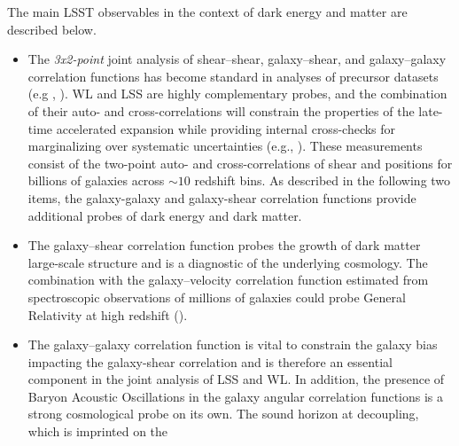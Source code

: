 The main LSST observables in the context of dark energy and matter are described below.

\begin{itemize}
\item The {\sl 3x2-point} joint analysis of shear--shear, galaxy--shear, and galaxy--galaxy
correlation functions has become standard in analyses of precursor datasets (e.g \cite{2017arXiv170801530D},
\cite{2017arXiv170706627J}). WL and LSS are highly complementary probes, and the combination
of their auto- and cross-correlations will constrain the properties of the late-time accelerated expansion while providing
internal cross-checks for marginalizing over systematic uncertainties (e.g., \cite{2017arXiv171003235M}).
These measurements consist of the two-point auto- and cross-correlations of shear and positions for billions of galaxies across $\sim 10$ redshift bins.
As described in the following two items, the galaxy-galaxy and galaxy-shear correlation functions provide additional probes of dark energy and dark matter.
%
%
\item The galaxy--shear correlation function probes the growth of dark matter large-scale structure and is a
diagnostic of the underlying cosmology. The combination with the
galaxy--velocity correlation function estimated from spectroscopic observations of millions of galaxies
could probe General Relativity at high redshift (\cite{Reyes2007}).
%
\item The galaxy--galaxy correlation function is vital to constrain the galaxy bias impacting the galaxy-shear correlation and is therefore
an essential component in the joint analysis of LSS and WL. In addition, the presence of
Baryon Acoustic Oscillations in the galaxy angular correlation functions is a strong cosmological
probe on its own. The sound horizon at decoupling, which is imprinted on the

\end{itemize}
